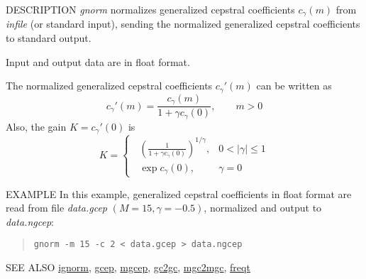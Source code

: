 \begin{synopsis}
\item [gnorm] [ --m $M$ ] [ --g $G$ ] [ --c $C$ ] [ {\em infile} ]
\end{synopsis}

\begin{qsection}{DESCRIPTION}
{\em gnorm} normalizes generalized cepstral coefficients $c_\gamma(m)$ 
from {\em infile} (or standard input), 
sending the normalized generalized cepstral coefficients to standard output.

Input and output data are in float format.

The normalized generalized cepstral coefficients $c_\gamma'(m)$
can be written as
\begin{displaymath}
c_\gamma'(m) = \frac{c_\gamma(m)}{1+\gamma c_\gamma(0)}, \qquad m>0
\end{displaymath}
Also, the gain $K = c_\gamma'(0)$ is
\begin{displaymath}
K = \begin{cases} \;\;\displaystyle
          \left(\frac{1}{1+\gamma c_\gamma(0)}\right)^{1/\gamma},
                & 0<|\gamma|\leq 1 \\ \;\;\displaystyle
          \exp c_\gamma(0),  & \gamma=0
        \end{cases}
\end{displaymath}
\end{qsection}

\begin{options}
\end{options}

\begin{qsection}{EXAMPLE}
In this example, generalized cepstral coefficients in float format
are read from file {\em data.gcep} $(M=15, \gamma=-0.5)$,
normalized and output to {\em data.ngcep}:
\begin{quote}
 \verb!gnorm -m 15 -c 2 < data.gcep > data.ngcep!
\end{quote} 
\end{qsection}

\begin{qsection}{SEE ALSO}
\hyperlink{ignorm}{ignorm},
\hyperlink{gcep}{gcep},
\hyperlink{mgcep}{mgcep},
\hyperlink{gc2gc}{gc2gc},
\hyperlink{mgc2mgc}{mgc2mgc},
\hyperlink{freqt}{freqt}
\end{qsection}
